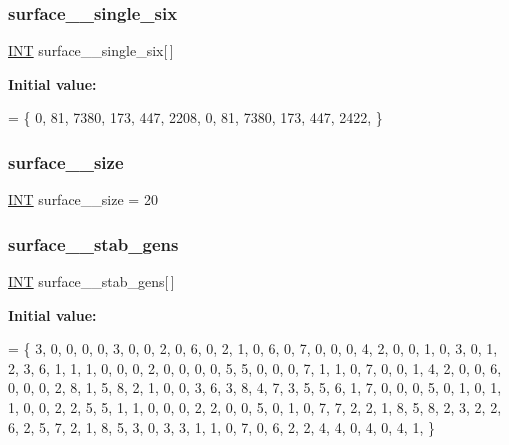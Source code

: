 \subsubsection{\texorpdfstring{surface\+\_\+\_\+single\+\_\+six}{surface\_9\_single\_six}}
{\footnotesize\ttfamily \mbox{\hyperlink{galois_8h_a09fddde158a3a20bd2dcadb609de11dc}{I\+NT}} surface\+\_\+\_\+single\+\_\+six\mbox{[}$\,$\mbox{]}}

{\bfseries Initial value\+:}
\begin{DoxyCode}
= \{ 
    0, 81, 7380, 173, 447, 2208, 
    0, 81, 7380, 173, 447, 2422, 
\}
\end{DoxyCode}
\mbox{\label{surface__9_8_c_acb4084b307d17aea4c63d7479a293e1f}} 
\subsubsection{\texorpdfstring{surface\+\_\+\_\+size}{surface\_9\_size}}
{\footnotesize\ttfamily \mbox{\hyperlink{galois_8h_a09fddde158a3a20bd2dcadb609de11dc}{I\+NT}} surface\+\_\+\_\+size = 20}

\mbox{\label{surface__9_8_c_a88cde949b780fac42807ff141e790fcc}} 
\subsubsection{\texorpdfstring{surface\+\_\+\_\+stab\+\_\+gens}{surface\_9\_stab\_gens}}
{\footnotesize\ttfamily \mbox{\hyperlink{galois_8h_a09fddde158a3a20bd2dcadb609de11dc}{I\+NT}} surface\+\_\+\_\+stab\+\_\+gens\mbox{[}$\,$\mbox{]}}

{\bfseries Initial value\+:}
\begin{DoxyCode}
= \{
    3, 0, 0, 0, 0, 3, 0, 0, 2, 0, 6, 0, 2, 1, 0, 6, 0, 
    7, 0, 0, 0, 4, 2, 0, 0, 1, 0, 3, 0, 1, 2, 3, 6, 1, 
    1, 1, 0, 0, 0, 2, 0, 0, 0, 0, 5, 5, 0, 0, 0, 7, 1, 
    1, 0, 7, 0, 0, 1, 4, 2, 0, 0, 6, 0, 0, 0, 2, 8, 1, 
    5, 8, 2, 1, 0, 0, 3, 6, 3, 8, 4, 7, 3, 5, 5, 6, 1, 
    7, 0, 0, 0, 5, 0, 1, 0, 1, 1, 0, 0, 2, 2, 5, 5, 1, 
    1, 0, 0, 0, 2, 2, 0, 0, 5, 0, 1, 0, 7, 7, 2, 2, 1, 
    8, 5, 8, 2, 3, 2, 2, 6, 2, 5, 7, 2, 1, 8, 5, 3, 0, 
    3, 3, 1, 1, 0, 7, 0, 6, 2, 2, 4, 4, 0, 4, 0, 4, 1, 
\}
\end{DoxyCode}
\mbox{\label{surface__9_8_c_af7aad653c4c81a79b4296680a0717b49}} 
